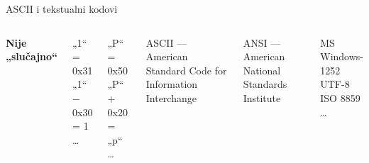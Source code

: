 \begin{frame}[label=06-s003]{ASCII i tekstualni kodovi}
\begin{columns}[c,onlytextwidth]
\centering
{}\fontsize{9}{10}\selectfont
{\bfseries Nije „slučajno“}\par\smallskip
„1“ = 0x31\\„1“ − 0x30 = 1\\\ldots\par\smallskip
„P“ = 0x50\\„P“ + 0x20 = „p“\\\ldots\par\medskip
{\fontsize{9}{10}\selectfont ASCII — American Standard Code for Information Interchange\par\smallskip ANSI — American National Standards Institute}\par\smallskip
MS Windows-1252\\UTF-8\\ISO 8859\\\ldots
\end{columns}
\end{frame}

